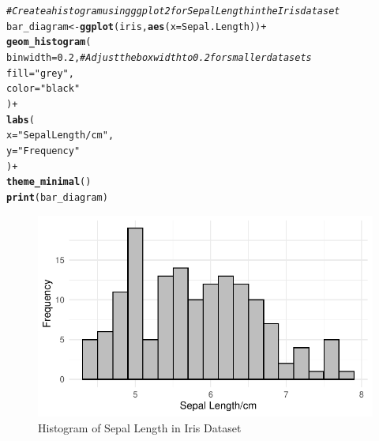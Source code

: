 \documentclass{article}\usepackage[]{graphicx}\usepackage[]{xcolor}
\makeatletter
\def\maxwidth{ %
  \ifdim\Gin@nat@width>\linewidth
    \linewidth
  \else
    \Gin@nat@width
  \fi
}
\newcommand{\hlnum}[1]{\textcolor[rgb]{0.686,0.059,0.569}{#1}}%
\newcommand{\hlstr}[1]{\textcolor[rgb]{0.192,0.494,0.8}{#1}}%
\newcommand{\hlcom}[1]{\textcolor[rgb]{0.678,0.584,0.686}{\textit{#1}}}%
\newcommand{\hlopt}[1]{\textcolor[rgb]{0,0,0}{#1}}%
\newcommand{\hlstd}[1]{\textcolor[rgb]{0.345,0.345,0.345}{#1}}%
\newcommand{\hlkwb}[1]{\textcolor[rgb]{0.69,0.353,0.396}{#1}}%
\newcommand{\hlkwc}[1]{\textcolor[rgb]{0.333,0.667,0.333}{#1}}%
\newcommand{\hlkwd}[1]{\textcolor[rgb]{0.737,0.353,0.396}{\textbf{#1}}}%
\newenvironment{kframe}{%
 \def\at@end@of@kframe{}%
 \ifinner\ifhmode%
  \def\at@end@of@kframe{\end{minipage}}%
  \begin{minipage}{\columnwidth}%
 \fi\fi%
 \def\FrameCommand##1{\hskip\@totalleftmargin \hskip-\fboxsep
 \colorbox{shadecolor}{##1}\hskip-\fboxsep
     \hskip-\linewidth \hskip-\@totalleftmargin \hskip\columnwidth}%
 \MakeFramed {\advance\hsize-\width
   \@totalleftmargin\z@ \linewidth\hsize
   \@setminipage}}%
 {\par\unskip\endMakeFramed%
 \at@end@of@kframe}
\newenvironment{knitrout}{}{} %
\makeatother
\begin{document}
\begin{knitrout}\scriptsize
{}\color{fgcolor}\begin{kframe}
\begin{alltt}
\hlcom{#Create a histogram using ggplot2 for Sepal Length in the Iris dataset}
\hlstd{bar_diagram} \hlkwb{<-} \hlkwd{ggplot}\hlstd{(iris,} \hlkwd{aes}\hlstd{(}\hlkwc{x} \hlstd{= Sepal.Length))} \hlopt{+}
  \hlkwd{geom_histogram}\hlstd{(}
    \hlkwc{binwidth} \hlstd{=} \hlnum{0.2}\hlstd{,}  \hlcom{# Adjust the box width to 0.2 for smaller data sets}
    \hlkwc{fill} \hlstd{=} \hlstr{"grey"}\hlstd{,}
    \hlkwc{color} \hlstd{=} \hlstr{"black"}
  \hlstd{)} \hlopt{+}
  \hlkwd{labs}\hlstd{(}
    \hlkwc{x} \hlstd{=} \hlstr{"Sepal Length/cm"}\hlstd{,}
    \hlkwc{y} \hlstd{=} \hlstr{"Frequency"}
  \hlstd{)} \hlopt{+}
  \hlkwd{theme_minimal}\hlstd{()}
\hlkwd{print}\hlstd{(bar_diagram)}
\end{alltt}
\end{kframe}\begin{figure}[H]

{\centering \includegraphics[width=\maxwidth]{figure/beamer-hist3-1} 

}

\caption[Histogram of Sepal Length in Iris Dataset]{Histogram of Sepal Length in Iris Dataset}\label{fig:hist3}
\end{figure}

\end{knitrout}
\end{document}

